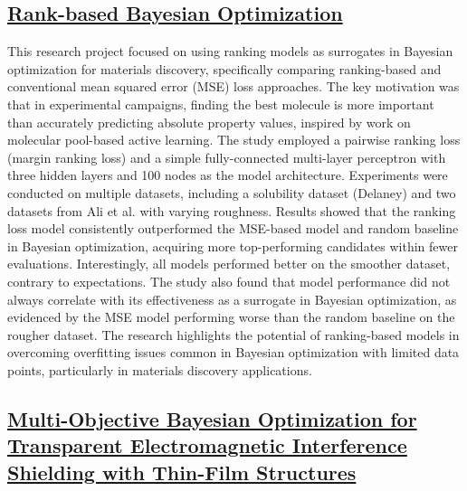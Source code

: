  \subsection*{\href{https://www.youtube.com/watch?v=c84Sd2IwMAQ&ab_channel=GaryTom}{Rank-based Bayesian Optimization}}

This research project focused on using ranking models as surrogates in Bayesian optimization for materials discovery, specifically comparing ranking-based and conventional mean squared error (MSE) loss approaches. The key motivation was that in experimental campaigns, finding the best molecule is more important than accurately predicting absolute property values, inspired by work on molecular pool-based active learning\cite{graff_accelerating_2021}. The study employed a pairwise ranking loss (margin ranking loss) and a simple fully-connected multi-layer perceptron with three hidden layers and 100 nodes as the model architecture. Experiments were conducted on multiple datasets, including a solubility dataset (Delaney) and two datasets from Ali et al. with varying roughness\cite{aldeghi_roughness_2022}. Results showed that the ranking loss model consistently outperformed the MSE-based model and random baseline in Bayesian optimization, acquiring more top-performing candidates within fewer evaluations. Interestingly, all models performed better on the smoother dataset, contrary to expectations. The study also found that model performance did not always correlate with its effectiveness as a surrogate in Bayesian optimization, as evidenced by the MSE model performing worse than the random baseline on the rougher dataset. The research highlights the potential of ranking-based models in overcoming overfitting issues common in Bayesian optimization with limited data points, particularly in materials discovery applications.
 \subsection*{\href{https://www.youtube.com/watch?v=RgEbcWIBDn8}{Multi-Objective Bayesian Optimization for Transparent Electromagnetic Interference Shielding with Thin-Film Structures}}

